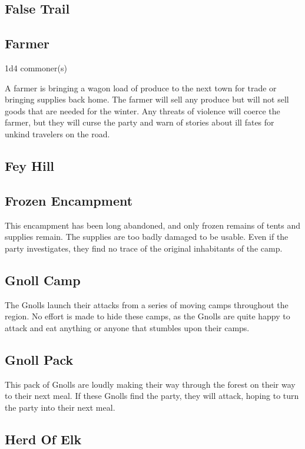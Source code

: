 \subsection{False Trail}

\subsection{Farmer}

1d4 commoner(s)

A farmer is bringing a wagon load of produce to the next town for trade or bringing supplies back home.
The farmer will sell any produce but will not sell goods that are needed for the winter.
Any threats of violence will coerce the farmer, but they will curse the party and warn of stories about ill fates for unkind travelers on the road.

\subsection{Fey Hill}

\subsection{Frozen Encampment}

This encampment has been long abandoned, and only frozen remains of tents and supplies remain.
The supplies are too badly damaged to be usable.
Even if the party investigates, they find no trace of the original inhabitants of the camp.

\subsection{Gnoll Camp}

The Gnolls launch their attacks from a series of moving camps throughout the region.
No effort is made to hide these camps, as the Gnolls are quite happy to attack and eat anything or anyone that stumbles upon their camps.

\subsection{Gnoll Pack}

This pack of Gnolls are loudly making their way through the forest on their way to their next meal.
If these Gnolls find the party, they will attack, hoping to turn the party into their next meal.

\subsection{Herd Of Elk}

